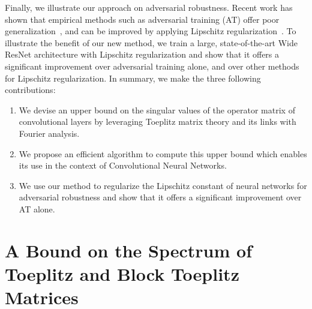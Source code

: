 Finally, we illustrate our approach on adversarial robustness.
Recent work has shown that empirical methods such as adversarial training (AT) offer poor generalization~\cite{schmidt2018adversarially}, and can be improved by applying Lipschitz regularization~\cite{farnia2018generalizable}.
To illustrate the benefit of our new method, we train a large, state-of-the-art Wide ResNet architecture with Lipschitz regularization and show that it offers a significant improvement over adversarial training alone, and over other methods for Lipschitz regularization.
In summary, we make the three following contributions:
\begin{enumerate}
  \item We devise an upper bound on the singular values of the operator matrix of convolutional layers by leveraging Toeplitz matrix theory and its links with Fourier analysis.
  \item We propose an efficient algorithm to compute this upper bound which enables its use in the context of Convolutional Neural Networks.
  \item We use our method to regularize the Lipschitz constant of neural networks for adversarial robustness and show that it offers a significant improvement over AT alone.
\end{enumerate}


\section{A Bound on the Spectrum of Toeplitz and Block Toeplitz Matrices}

